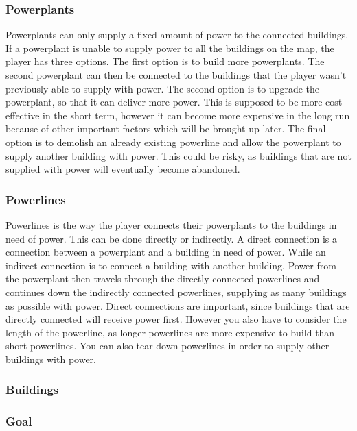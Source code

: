 \subsubsection{Powerplants}
Powerplants can only supply a fixed amount of power to the connected buildings. If a powerplant is 
unable to supply power to all the buildings on the map, the player has three options. The first option 
is to build more powerplants. The second powerplant can then be connected to the buildings that the
player wasn't previously able to supply with power. The second option is to upgrade the powerplant,
so that it can deliver more power. This is supposed to be more cost effective in the short term, however
it can become more expensive in the long run because of other important factors which will be brought
up later. The final option is to demolish an already existing powerline and allow the powerplant to
supply another building with power. This could be risky, as buildings that are not supplied with power
will eventually become abandoned.

\subsubsection{Powerlines}
Powerlines is the way the player connects their powerplants to the buildings in need of power. This 
can be done directly or indirectly. A direct connection is a connection between a powerplant and a 
building in need of power. While an indirect connection is to connect a building with another building.
Power from the powerplant then travels through the directly connected powerlines and continues down 
the indirectly connected powerlines, supplying as many buildings as possible with power. Direct 
connections are important, since buildings that are directly connected will receive power first.
However you also have to consider the length of the powerline, as longer powerlines are more expensive
to build than short powerlines. You can also tear down powerlines in order to supply other buildings
with power.

\subsubsection{Buildings}

\subsubsection{Goal}

